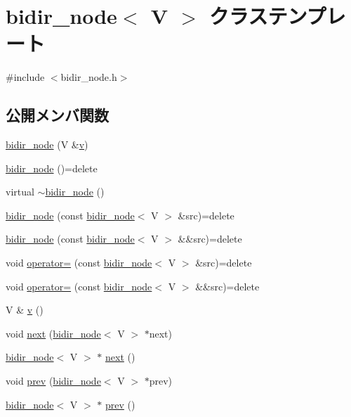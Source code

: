 \hypertarget{classbidir__node}{}\section{bidir\+\_\+node$<$ V $>$ クラステンプレート}
\label{classbidir__node}


{\ttfamily \#include $<$bidir\+\_\+node.\+h$>$}

\subsection*{公開メンバ関数}
\begin{DoxyCompactItemize}
\item 
\hyperlink{classbidir__node_a854687b3c2abf8087c390bc4d7ef90d9}{bidir\+\_\+node} (V \&\hyperlink{classbidir__node_a144596c53772e441240d51afeb8a475d}{v})
\item 
\hyperlink{classbidir__node_ac26a6b2da36bc1dc71939a22a66fa101}{bidir\+\_\+node} ()=delete
\item 
virtual \hyperlink{classbidir__node_a73267f07aa67bd4488fa684f1c5303b3}{$\sim$bidir\+\_\+node} ()
\item 
\hyperlink{classbidir__node_a72f9a152c3e7003b34b63de3c4bf3387}{bidir\+\_\+node} (const \hyperlink{classbidir__node}{bidir\+\_\+node}$<$ V $>$ \&src)=delete
\item 
\hyperlink{classbidir__node_a3b3ad0976fcc289d9726572700e02972}{bidir\+\_\+node} (const \hyperlink{classbidir__node}{bidir\+\_\+node}$<$ V $>$ \&\&src)=delete
\item 
void \hyperlink{classbidir__node_a4e0e59b16c9f182cb917e821b42e9c35}{operator=} (const \hyperlink{classbidir__node}{bidir\+\_\+node}$<$ V $>$ \&src)=delete
\item 
void \hyperlink{classbidir__node_a799804bad3c1554f9064ee77bbc46302}{operator=} (const \hyperlink{classbidir__node}{bidir\+\_\+node}$<$ V $>$ \&\&src)=delete
\item 
V \& \hyperlink{classbidir__node_a144596c53772e441240d51afeb8a475d}{v} ()
\item 
void \hyperlink{classbidir__node_a2e0451434557bab73a6950037073267a}{next} (\hyperlink{classbidir__node}{bidir\+\_\+node}$<$ V $>$ $\ast$next)
\item 
\hyperlink{classbidir__node}{bidir\+\_\+node}$<$ V $>$ $\ast$ \hyperlink{classbidir__node_af76a5d53aff4b6f71361fa7477d0c758}{next} ()
\item 
void \hyperlink{classbidir__node_a7864b76461d92f398efb90819854f67c}{prev} (\hyperlink{classbidir__node}{bidir\+\_\+node}$<$ V $>$ $\ast$prev)
\item 
\hyperlink{classbidir__node}{bidir\+\_\+node}$<$ V $>$ $\ast$ \hyperlink{classbidir__node_a4316757bf16173a1c04d84ddbc7fefc2}{prev} ()
\end{DoxyCompactItemize}
